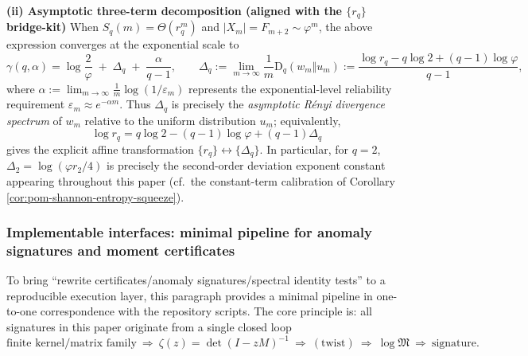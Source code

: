 \begin{remark}
\medskip\noindent\textbf{(ii) Asymptotic three-term decomposition (aligned with the \(\{r_q\}\) bridge-kit)}
When \(S_q(m)=\Theta(r_q^m)\) and \(|X_m|=F_{m+2}\sim\varphi^m\), the above expression converges at the exponential scale to
\[
\gamma(q,\alpha)
=
\log\frac{2}{\varphi}
\;+\;
\Delta_q
\;+\;
\frac{\alpha}{q-1},
\qquad
\Delta_q:=\lim_{m\to\infty}\frac{1}{m}\mathrm{D}_q(w_m\Vert u_m)
:=\frac{\log r_q-q\log 2+(q-1)\log\varphi}{q-1},
\]
where \(\alpha:=\lim_{m\to\infty}\frac{1}{m}\log(1/\varepsilon_m)\) represents the exponential-level reliability requirement \(\varepsilon_m\approx e^{-\alpha m}\).
Thus \(\Delta_q\) is precisely the \emph{asymptotic R\'enyi divergence spectrum} of \(w_m\) relative to the uniform distribution \(u_m\); equivalently,
\[
\log r_q
=q\log 2-(q-1)\log\varphi+(q-1)\Delta_q
\]
gives the explicit affine transformation \(\{r_q\}\leftrightarrow\{\Delta_q\}\).
In particular, for \(q=2\),
\(
\Delta_2=\log(\varphi r_2/4)
\)
is precisely the second-order deviation exponent constant appearing throughout this paper (cf.\ the constant-term calibration of Corollary \ref{cor:pom-shannon-entropy-squeeze}).
\end{remark}

\subsubsection{Implementable interfaces: minimal pipeline for anomaly signatures and moment certificates}\label{subsec:pom-implementable-interfaces}

To bring ``rewrite certificates/anomaly signatures/spectral identity tests'' to a reproducible execution layer, this paragraph provides a minimal pipeline in one-to-one correspondence with the repository scripts.
The core principle is: all signatures in this paper originate from a single closed loop
$$
\text{finite kernel/matrix family}\ \Longrightarrow\ \zeta(z)=\det(I-zM)^{-1}\ \Longrightarrow\ (\text{twist})\ \Longrightarrow\ \log\mathfrak{M}\ \Longrightarrow\ \text{signature}.
$$

